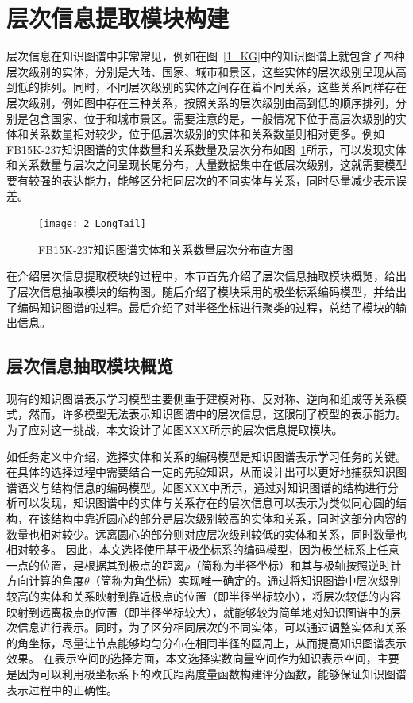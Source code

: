 \documentclass[algorithmlist, AutoFakeBold, AutoFakeSlant, figurelist, tablelist, nomlist, masters]{seuthesix}
\begin{document}
\section{层次信息提取模块构建}
层次信息在知识图谱中非常常见，例如在图~\ref{1_KG}中的知识图谱上就包含了四种层次级别的实体，分别是大陆、国家、城市和景区，这些实体的层次级别呈现从高到低的排列。同时，不同层次级别的实体之间存在着不同关系，这些关系同样存在层次级别，例如图中存在三种关系，按照关系的层次级别由高到低的顺序排列，分别是包含国家、位于和城市景区。需要注意的是，一般情况下位于高层次级别的实体和关系数量相对较少，位于低层次级别的实体和关系数量则相对更多。例如FB15K-237知识图谱的实体数量和关系数量及层次分布如图~\ref{2_LongTail}所示，可以发现实体和关系数量与层次之间呈现长尾分布，大量数据集中在低层次级别，这就需要模型要有较强的表达能力，能够区分相同层次的不同实体与关系，同时尽量减少表示误差。
\begin{figure}
  \centering
  \texttt{[image: 2\_LongTail]}
  \caption{FB15K-237知识图谱实体和关系数量层次分布直方图}
  \label{2_LongTail}
\end{figure}

在介绍层次信息提取模块的过程中，本节首先介绍了层次信息抽取模块概览，给出了层次信息抽取模块的结构图。随后介绍了模块采用的极坐标系编码模型，并给出了编码知识图谱的过程。最后介绍了对半径坐标进行聚类的过程，总结了模块的输出信息。

\subsection{层次信息抽取模块概览}
现有的知识图谱表示学习模型主要侧重于建模对称、反对称、逆向和组成等关系模式，然而，许多模型无法表示知识图谱中的层次信息，这限制了模型的表示能力。为了应对这一挑战，本文设计了如图XXX所示的层次信息提取模块。

如任务定义中介绍，选择实体和关系的编码模型是知识图谱表示学习任务的关键。在具体的选择过程中需要结合一定的先验知识，从而设计出可以更好地捕获知识图谱语义与结构信息的编码模型。如图XXX中所示，通过对知识图谱的结构进行分析可以发现，知识图谱中的实体与关系存在的层次信息可以表示为类似同心圆的结构，在该结构中靠近圆心的部分是层次级别较高的实体和关系，同时这部分内容的数量也相对较少。远离圆心的部分则对应层次级别较低的实体和关系，同时数量也相对较多。
因此，本文选择使用基于极坐标系的编码模型，因为极坐标系上任意一点的位置，是根据其到极点的距离$\rho$（简称为半径坐标）和其与极轴按照逆时针方向计算的角度$\theta$（简称为角坐标）实现唯一确定的。通过将知识图谱中层次级别较高的实体和关系映射到靠近极点的位置（即半径坐标较小），将层次较低的内容映射到远离极点的位置（即半径坐标较大），就能够较为简单地对知识图谱中的层次信息进行表示。同时，为了区分相同层次的不同实体，可以通过调整实体和关系的角坐标，尽量让节点能够均匀分布在相同半径的圆周上，从而提高知识图谱表示效果。
在表示空间的选择方面，本文选择实数向量空间作为知识表示空间，主要是因为可以利用极坐标系下的欧氏距离度量函数构建评分函数，能够保证知识图谱表示过程中的正确性。
\end{document}
